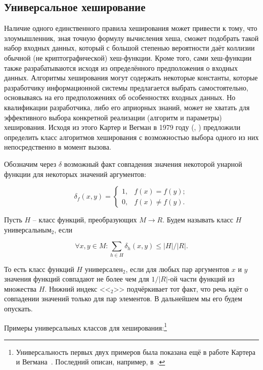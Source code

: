 \subsection{Универсальное хеширование}\label{sec:universal-hashing}
Наличие одного единственного правила хеширования может привести к тому, что злоумышленник, зная точную формулу вычисления хеша, сможет подобрать такой набор входных данных, который с большой степенью вероятности даёт коллизии обычной (не криптографической) хеш-функции. Кроме того, сами хеш-функции также разрабатываются исходя из определённого предположения о входных данных. Алгоритмы хеширования могут содержать некоторые константы, которые разработчику информационной системы предлагается выбрать самостоятельно, основываясь на его предположениях об особенностях входных данных. Но квалификации разработчика, либо его априорных знаний, может не хватать для эффективного выбора конкретной реализации (алгоритм и параметры) хеширования. Исходя из этого Картер и Вегман в 1979 году (, \cite{Carter:Wegman:1979}) предложили определить класс алгоритмов хеширования с возможностью выбора одного из них непосредственно в момент вызова.

Обозначим через $\delta$ возможный факт совпадения значения некоторой унарной функции для некоторых значений аргументов:

\[
\delta_{f}( x, y ) = \left\{\begin{matrix}
1, & f(x) = f(y);\\ 
0, & f(x) \neq f(y).
\end{matrix}\right.
\]

Пусть $H$ -- класс функций, преобразующих $M \to R$. Будем называть класс $H$ универсальным$_{2}$, если

\[
\forall x, y \in M: \sum_{h \in H} \delta_{h}( x, y ) \leq |H| / |R|.
\]

То есть класс функций $H$ универсален$_{2}$, если для любых пар аргументов $x$ и $y$ значения функций совпадают не более чем для $1/|R|$-ой части функций из множества $H$. Нижний индекс <<$_{2}$>> подчёркивает тот факт, что речь идёт о совпадении значений только для пар элементов. В дальнейшем мы его будем опускать.

Примеры универсальных классов для хеширования:\footnote{Универсальность первых двух примеров была показана ещё в работе Картера и Вегмана~\cite{Carter:Wegman:1979}. Последний описан, например, в~\cite{Dietzfelbinger:Gil:Matias:Pippenger:1992}.}

